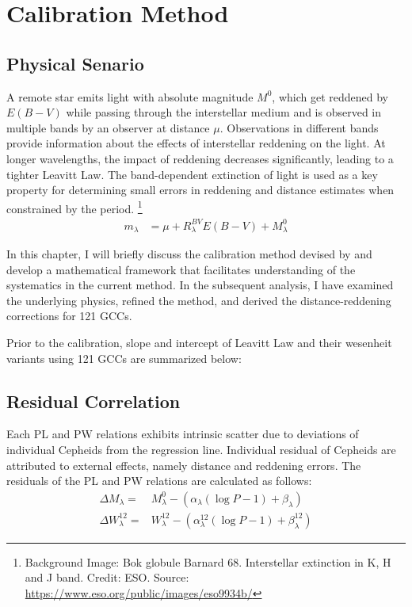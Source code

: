 \chapter{Calibration Method}
\label{methodchap}





\section{Physical Senario}

A remote star emits light with absolute magnitude $M^0$, which get reddened by $E(B-V)$ while passing through the interstellar medium and is observed in multiple bands by an observer at distance $\mu$. Observations in different bands provide information about the effects of interstellar reddening on the light. At longer wavelengths, the impact of reddening decreases significantly, leading to a tighter Leavitt Law. The band-dependent extinction of light is used as a key property for determining small errors in reddening and distance estimates when constrained by the period. \footnote{Background Image: Bok globule Barnard 68. Interstellar extinction in K, H and J band. Credit: ESO. Source: \url{https://www.eso.org/public/images/eso9934b/}}
\begin{align}
    \label{modeleq}
    m_\lambda & = \mu +  R_\lambda^{BV} E(B-V) + M^0_\lambda 
\end{align}



In this chapter, I will briefly discuss the calibration method devised by \cite{2017madore} and develop a mathematical framework that facilitates understanding of the systematics in the current method. In the subsequent analysis, I have examined the underlying physics, refined the method, and derived the distance-reddening corrections for 121 GCCs. 

Prior to the calibration, slope and intercept of Leavitt Law and their wesenheit variants using 121 GCCs are summarized below:
 
\section{Residual Correlation}
Each PL and PW relations exhibits intrinsic scatter due to deviations of individual Cepheids from the regression line. Individual residual of Cepheids are attributed to external effects, namely distance and reddening errors. The residuals of the PL and PW relations are calculated as follows:
\begin{align}
	\label{del_M}
	\Delta M_\lambda = & M^0_\lambda - (\alpha_\lambda (\log P - 1) + \beta_\lambda)\\
	\Delta W_\lambda^{12} = & W_\lambda^{12} - (\alpha^{12}_\lambda (\log P - 1) + \beta^{12}_\lambda) 
\end{align}
\vspace{-0.2cm}

